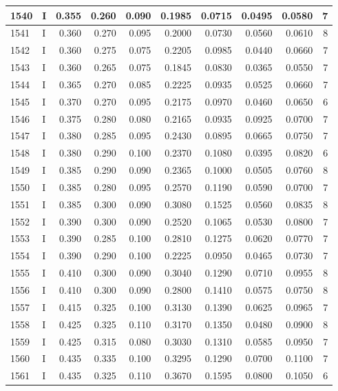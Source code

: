 \documentclass[9pt,twocolumn,twoside,]{pnas-new}
\begin{document}
\begin{tabular}{l|l|r|r|r|r|r|r|r|r}
\hline
1540 & I & 0.355 & 0.260 & 0.090 & 0.1985 & 0.0715 & 0.0495 & 0.0580 & 7\\
\hline
1541 & I & 0.360 & 0.270 & 0.095 & 0.2000 & 0.0730 & 0.0560 & 0.0610 & 8\\
\hline
1542 & I & 0.360 & 0.275 & 0.075 & 0.2205 & 0.0985 & 0.0440 & 0.0660 & 7\\
\hline
1543 & I & 0.360 & 0.265 & 0.075 & 0.1845 & 0.0830 & 0.0365 & 0.0550 & 7\\
\hline
1544 & I & 0.365 & 0.270 & 0.085 & 0.2225 & 0.0935 & 0.0525 & 0.0660 & 7\\
\hline
1545 & I & 0.370 & 0.270 & 0.095 & 0.2175 & 0.0970 & 0.0460 & 0.0650 & 6\\
\hline
1546 & I & 0.375 & 0.280 & 0.080 & 0.2165 & 0.0935 & 0.0925 & 0.0700 & 7\\
\hline
1547 & I & 0.380 & 0.285 & 0.095 & 0.2430 & 0.0895 & 0.0665 & 0.0750 & 7\\
\hline
1548 & I & 0.380 & 0.290 & 0.100 & 0.2370 & 0.1080 & 0.0395 & 0.0820 & 6\\
\hline
1549 & I & 0.385 & 0.290 & 0.090 & 0.2365 & 0.1000 & 0.0505 & 0.0760 & 8\\
\hline
1550 & I & 0.385 & 0.280 & 0.095 & 0.2570 & 0.1190 & 0.0590 & 0.0700 & 7\\
\hline
1551 & I & 0.385 & 0.300 & 0.090 & 0.3080 & 0.1525 & 0.0560 & 0.0835 & 8\\
\hline
1552 & I & 0.390 & 0.300 & 0.090 & 0.2520 & 0.1065 & 0.0530 & 0.0800 & 7\\
\hline
1553 & I & 0.390 & 0.285 & 0.100 & 0.2810 & 0.1275 & 0.0620 & 0.0770 & 7\\
\hline
1554 & I & 0.390 & 0.290 & 0.100 & 0.2225 & 0.0950 & 0.0465 & 0.0730 & 7\\
\hline
1555 & I & 0.410 & 0.300 & 0.090 & 0.3040 & 0.1290 & 0.0710 & 0.0955 & 8\\
\hline
1556 & I & 0.410 & 0.300 & 0.090 & 0.2800 & 0.1410 & 0.0575 & 0.0750 & 8\\
\hline
1557 & I & 0.415 & 0.325 & 0.100 & 0.3130 & 0.1390 & 0.0625 & 0.0965 & 7\\
\hline
1558 & I & 0.425 & 0.325 & 0.110 & 0.3170 & 0.1350 & 0.0480 & 0.0900 & 8\\
\hline
1559 & I & 0.425 & 0.315 & 0.080 & 0.3030 & 0.1310 & 0.0585 & 0.0950 & 7\\
\hline
1560 & I & 0.435 & 0.335 & 0.100 & 0.3295 & 0.1290 & 0.0700 & 0.1100 & 7\\
\hline
1561 & I & 0.435 & 0.325 & 0.110 & 0.3670 & 0.1595 & 0.0800 & 0.1050 & 6\\

\end{tabular}
\end{document}
